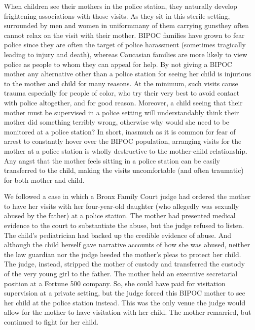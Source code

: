 When children see their mothers in the police station, they naturally
develop frightening associations with those visits. As they sit in this 
sterile setting, surrounded by men and women in uniform\mdash{}many of them
carrying guns\mdash{}they often cannot relax on the visit with their mother.
BIPOC families have grown to fear police since they are often the target
of police harassment (sometimes tragically leading to injury and death),
whereas Caucasian families are more likely to view police as people to
whom they can appeal for help. By not giving a BIPOC mother any 
alternative other than a police station for seeing her child is injurious to
the mother and child for many reasons. At the minimum, such visits
cause trauma especially for people of color, who try their very best to
avoid contact with police altogether, and for good reason. Moreover, a
child seeing that their mother must be supervised in a police setting will
understandably think their mother did something terribly wrong, 
otherwise why would she need to be monitored at a police station?
In short, inasmuch as
it is common for fear of arrest to constantly hover over the
BIPOC population, arranging visits for the mother at a police station is
wholly destructive to the 
mother\hspace{-.5pt}-\hspace{.5pt}child relationship. Any angst that the
mother feels sitting in a police station can be easily transferred to the
child, making the visits uncomfortable (and often traumatic) for both
mother and child. \pfl{}

We followed a case in which a Bronx Family Court judge had ordered
the mother to have her visits with her four-year-old daughter (who 
allegedly was sexually abused by the father) at a police station. The mother
had presented medical evidence to the court to substantiate the abuse,
but the judge refused to listen. The child’s pediatrician had backed up
the credible evidence of abuse. And although the child herself gave 
narrative accounts of how she was abused, neither the law guardian nor
the judge heeded the mother’s pleas to protect her child. The judge, 
instead, stripped the mother of custody and transferred the custody of
the very young girl to the father. The mother held an executive 
secretarial position at a Fortune 500 company. So, she could have paid
for visitation supervision at a private setting, but the judge forced this
BIPOC mother to see her child at the police station instead. This was
the only venue the judge would allow for the mother to have visitation
with her child. The mother remarried, but continued to fight for her
child. \pfl{}


